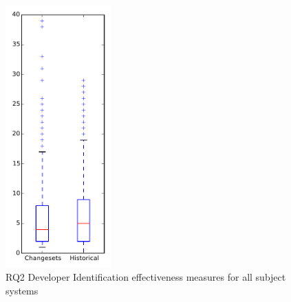 
\begin{figure}[t]
\centering
\includegraphics[width=0.36\textwidth]{figures/dit/rq2_overview}
\caption{RQ2 Developer Identification effectiveness measures for all subject systems}
\label{fig:dit:rq2:overview}
\end{figure}
